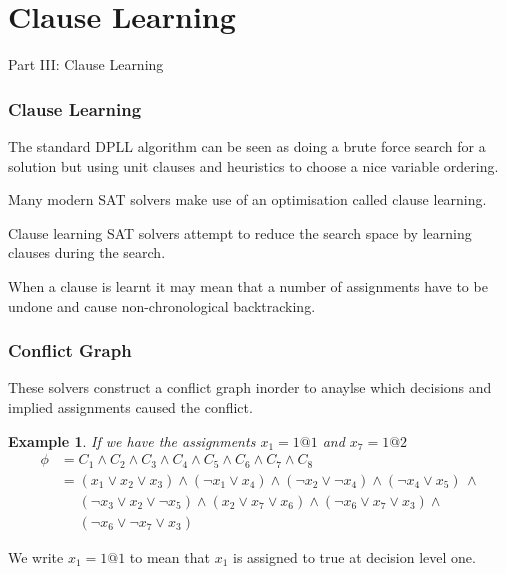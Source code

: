 \documentclass{beamer}
\newtheorem{myexample}{Example}
\begin{document}
\section{Clause Learning}

\begin{frame}
\begin{center}
{\Large Part III: Clause Learning}
\end{center}

\end{frame}


\begin{frame}
\frametitle{Clause Learning}
The standard DPLL algorithm can be seen as doing a brute force search for a solution but using unit clauses and heuristics to choose a nice variable ordering.

\medskip

Many modern SAT solvers make use of an optimisation called \alert{clause learning}.

\medskip

Clause learning SAT solvers attempt to reduce the search space by learning clauses during the search.
\medskip

When a clause is learnt it may mean that a number of assignments have to be undone and cause \alert{non-chronological backtracking}.


\end{frame}

\begin{frame}
\frametitle{Conflict Graph}
These solvers construct a \alert{conflict graph} inorder to anaylse which decisions and implied assignments caused the conflict.

\begin{myexample}
If we have the assignments $x_1 = 1@1$ and $x_7 = 1@2$
\begin{align*}
        \phi &=C_1 \wedge C_2 \wedge C_3 \wedge C_4 \wedge C_5 \wedge C_6 \wedge C_ 7 \wedge C_8\\
               &= (x_1 \vee x_2 \vee x_3) \wedge (\neg x_1 \vee x_4) \wedge (\neg x_2 \vee \neg x_4) \wedge (\neg x_4 \vee x_5) \, \wedge \\
               &\hspace{16pt} (\neg x_3 \vee x_2 \vee  \neg x_5) \wedge (x_2 \vee x_7 \vee x_6) \wedge (\neg x_6 \vee  x_7 \vee x_3) \wedge \\
               &\hspace{16pt}(\neg x_6 \vee \neg x_7 \vee x_3)
\end{align*}
\end{myexample}

We write $x_1  = 1@1$ to mean that $x_1$ is assigned to true at decision level one.


\end{frame}
\end{document}
